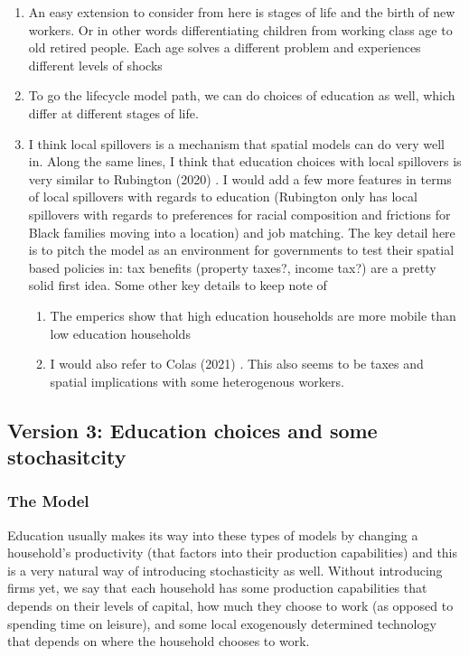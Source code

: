 \documentclass[11pt,english]{article}
\begin{document}
\begin{enumerate}
\item An easy extension to consider from here is stages of life and the birth of new workers. Or in other words differentiating children from working class age to old retired people. Each age solves a different problem and experiences different levels of shocks 

\item To go the lifecycle model path, we can do choices of education as well, which differ at different stages of life.

\item I think local spillovers is a mechanism that spatial models can do very well in. Along the same lines, I think that education choices with local spillovers is very similar to Rubington (2020) \cite{Rubington2022}. I would add a few more features in terms of local spillovers with regards to education (Rubington only has local spillovers with regards to preferences for racial composition and frictions for Black families moving into a location) and job matching. The key detail here is to pitch the model as an environment for governments to test their spatial based policies in: tax benefits (property taxes?, income tax?) are a pretty solid first idea. Some other key details to keep note of
\begin{enumerate}
\item The emperics show that high education households are more mobile than low education households

\item I would also refer to Colas (2021) \cite{Colas2021}. This also seems to be taxes and spatial implications with some heterogenous workers.
\end{enumerate}
\end{enumerate}


\subsection{Version 3: Education choices and some stochasitcity}

\subsubsection{The Model}

Education usually makes its way into these types of models by changing a household's productivity (that factors into their production capabilities) and this is a very natural way of introducing stochasticity as well. Without introducing firms yet, we say that each household has some production capabilities that depends on their levels of capital, how much they choose to work (as opposed to spending time on leisure), and some local exogenously determined technology that depends on where the household chooses to work.\\
\end{document}
